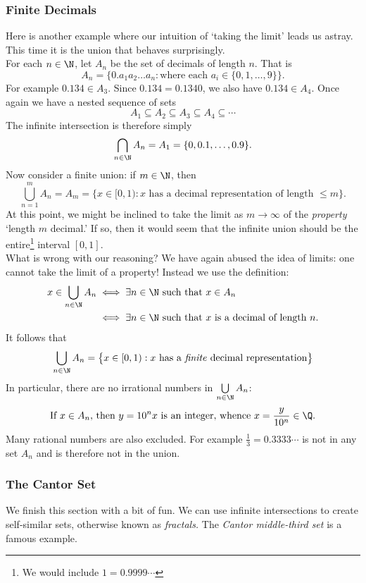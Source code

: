 \subsubsection*{Finite Decimals}\label{ex:finitedec}

Here is another example where our intuition of `taking the limit' leads us astray. This time it is the union that behaves surprisingly.\\

\noindent For each $n\in\N$, let $A_n$ be the set of decimals of length $n$. That is
\[A_n=\bigl\{0.a_1a_2\ldots a_n:\text{where each $a_i\in\{0,1,\ldots,9\}$}\bigr\}.\]
For example $0.134\in A_3$. Since $0.134=0.1340$, we also have $0.134\in A_4$. Once again we have a nested sequence of sets
\[A_1\subseteq A_2\subseteq A_3\subseteq A_4\subseteq\cdots\]
The infinite intersection is therefore simply
\[\bigcap_{n\in\N}A_n=A_1=\{0,0.1,\ldots,0.9\}.\]
Now consider a finite union: if $m\in\N$, then
\[\bigcup_{n=1}^mA_n=A_m=\bigl\{x\in [0,1):x\text{ has a decimal representation of length $\le m$}\bigr\}.\]
At this point, we might be inclined to take the limit as $m\to\infty$ of the \emph{property} `length $m$ decimal.' If so, then it would seem that the infinite union should be the entire\footnote{We would include $1=0.9999\cdots$} interval $[0,1]$.\\
What is wrong with our reasoning? We have again abused the idea of limits: one cannot take the limit of a property! Instead we use the definition:
\begin{align*}
x\in\bigcup_{n\in\N}A_n&\iff\exists n\in\N\text{ such that }x\in A_n\\
&\iff\exists n\in\N \text{ such that $x$ is a decimal of length $n$.}
\end{align*}
It follows that
\[\bigcup_{n\in\N}A_n=\big\{x\in[0,1):x\text{ has a \emph{finite} decimal representation}\big\}\]
In particular, there are no irrational numbers in $\bigcup\limits_{n\in\N}A_n$:
\[\text{If $x\in A_n$, then $y=10^nx$ is an integer, whence $x=\frac y{10^n}\in\Q$.}\]
Many rational numbers are also excluded. For example $\frac 13=0.3333\cdots$ is not in any set $A_n$ and is therefore not in the union.


\subsubsection*{The Cantor Set}\label{ex:cantor}

We finish this section with a bit of fun. We can use infinite intersections to create self-similar sets, otherwise known as \emph{fractals.} The \emph{Cantor middle-third set} is a famous example.\\

